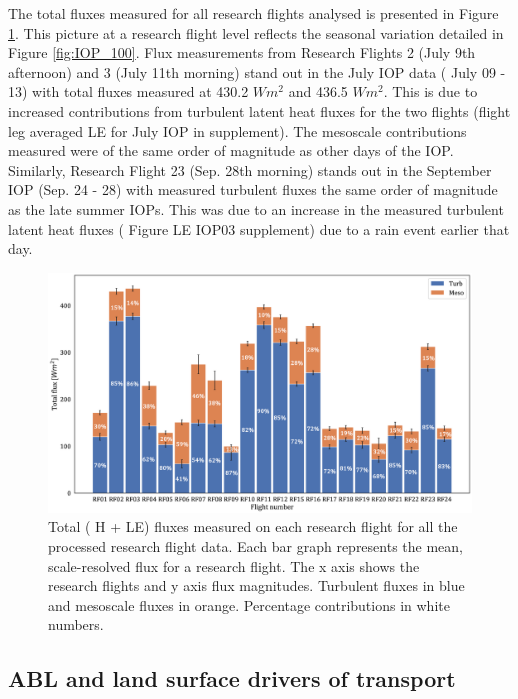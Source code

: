 \documentclass[draft]{agujournal2019}
\begin{document}
The total fluxes measured for all research flights analysed is presented in Figure \ref{fig:flight_100}. This picture at a research flight level reflects the seasonal variation detailed in Figure \ref{fig:IOP_100}. Flux measurements from Research Flights 2 (July 9th afternoon) and 3 (July 11th morning) stand out in the July IOP data ( July 09 - 13) with total fluxes measured at 430.2 $W m^{2}$ and 436.5 $W m^{2}$. This is due to increased contributions from turbulent latent heat fluxes for the two flights (flight leg averaged LE for July IOP in supplement).  The mesoscale contributions measured were of the same order of magnitude as other days of the IOP. Similarly, Research Flight 23 (Sep. 28th morning) stands out in the September IOP (Sep. 24 - 28) with measured turbulent fluxes the same order of magnitude as the late summer IOPs. This was due to an increase in the measured turbulent latent heat fluxes ( Figure LE IOP03 supplement) due to a rain event earlier that day.
\begin{figure}[hbtp]
 \noindent\includegraphics[width=\textwidth]{figures_main/flight_100.eps}
\caption{Total ( H + LE) fluxes measured on each research flight for all the processed research flight data. Each bar graph represents the mean, scale-resolved flux for a research flight. The x axis shows the research flights and y axis flux magnitudes. Turbulent fluxes in blue and mesoscale fluxes in orange. Percentage contributions in white numbers.}
\label{fig:flight_100}
\end{figure}

\newpage

\subsection{ABL and land surface drivers of transport}
\end{document}
